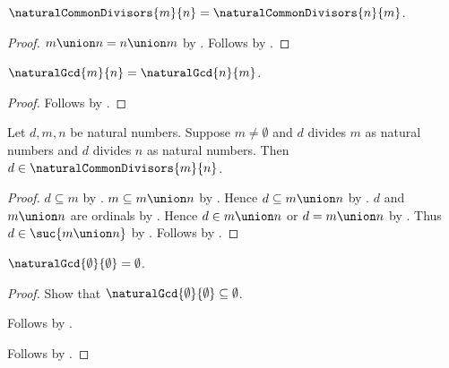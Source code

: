 \begin{proposition}\label{common_divisors_symmetric}
    $\naturalCommonDivisors{m}{n}
        =\naturalCommonDivisors{n}{m}$.
\end{proposition}
\begin{proof}
    $m\union n=n\union m$ by .
    Follows by
        .
\end{proof}

\begin{proposition}\label{natural_gcd_symmetric}
    $\naturalGcd{m}{n}=\naturalGcd{n}{m}$.
\end{proposition}
\begin{proof}
    Follows by
        .
\end{proof}

\begin{proposition}\label{common_divisor_in_bounded_set}
    Let $d,m,n$ be natural numbers.
    Suppose $m\neq\emptyset$ and
        $d$ divides $m$ as natural numbers and
        $d$ divides $n$ as natural numbers.
    Then $d\in\naturalCommonDivisors{m}{n}$.
\end{proposition}
\begin{proof}
    $d\subseteq m$
        by .
    $m\subseteq m\union n$ by .
    Hence $d\subseteq m\union n$ by .
    $d$ and $m\union n$ are ordinals
        by .
    Hence $d\in m\union n$ or $d=m\union n$
        by .
    Thus $d\in\suc{m\union n}$ by .
    Follows by .
\end{proof}

\begin{proposition}\label{natural_gcd_zero_zero}
    $\naturalGcd{\emptyset}{\emptyset}=\emptyset$.
\end{proposition}
\begin{proof}
    Show that $\naturalGcd{\emptyset}{\emptyset}\subseteq\emptyset$.
    \begin{subproof}
        Follows by
            .
    \end{subproof}
    Follows by .
\end{proof}


